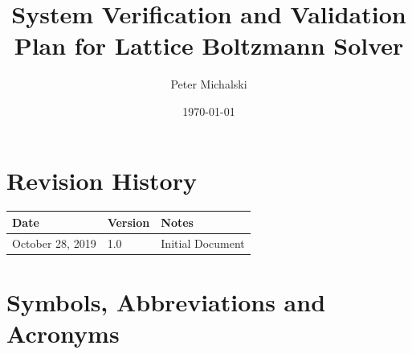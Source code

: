 \documentclass[12pt, titlepage]{article}
\newcommand{\myprogname}{Lattice Boltzmann Solver}
\begin{document}
\title{System Verification and Validation Plan for \myprogname} 
\author{Peter Michalski}
\date{\today}
	
\maketitle


\section{Revision History}

\begin{tabularx}{\textwidth}{p{4cm}p{2cm}X}
\toprule {\bf Date} & {\bf Version} & {\bf Notes}\\
\midrule
October 28, 2019 & 1.0 & Initial Document\\
\bottomrule
\end{tabularx}

\newpage

\tableofcontents

\newpage

\listoftables

\listoffigures

\newpage

\section{Symbols, Abbreviations and Acronyms}
\end{document}
